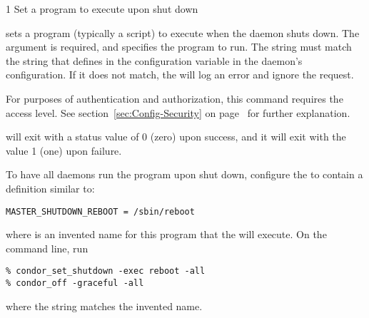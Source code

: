 \begin{ManPage}{\label{man-condor-set-shutdown}}{1}
{Set a program to execute upon  shut down}
\Synopsis {}
\ToolArgsBase

\ToolDebugOption
\ToolWhere


\Description 

 sets a program (typically a script) to execute
when the  daemon shuts down.
The  argument is required,
and specifies the program to run.  
The string  must match the
string that defines  in the configuration variable
 in the  daemon's
configuration. 
If it does not match, the  will log an error and ignore the
request.

For purposes of authentication and authorization,
this command requires the  access level.
See
section~\ref{sec:Config-Security} on page~\pageref{sec:Config-Security}
for further explanation.

\begin{Options}
  \ToolArgsBaseDesc
  \ToolDebugDesc
  \ToolArgsLocateDesc
\end{Options}

\ExitStatus
{} will exit with a status value of 0 (zero) upon
success, and it will exit with the value 1 (one) upon failure.


\Examples
To have all  daemons run the program
 upon shut down, configure the  
to contain a definition similar to:
\begin{verbatim}
MASTER_SHUTDOWN_REBOOT = /sbin/reboot
\end{verbatim}
where  is an invented name for this program that
the  will execute.
On the command line, run
\begin{verbatim}
% condor_set_shutdown -exec reboot -all
% condor_off -graceful -all
\end{verbatim}
where the string \verb@reboot@ matches the invented name.

\end{ManPage}
